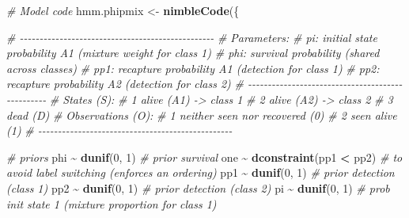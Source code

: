\documentclass[
  12pt,
]{krantz}
\newenvironment{Shaded}{\begin{snugshade}}{\end{snugshade}}
\newcommand{\CommentTok}[1]{\textcolor[rgb]{0.56,0.35,0.01}{\textit{#1}}}
\newcommand{\DecValTok}[1]{\textcolor[rgb]{0.00,0.00,0.81}{#1}}
\newcommand{\FunctionTok}[1]{\textcolor[rgb]{0.13,0.29,0.53}{\textbf{#1}}}
\newcommand{\NormalTok}[1]{#1}
\newcommand{\OtherTok}[1]{\textcolor[rgb]{0.56,0.35,0.01}{#1}}
\newcommand{\SpecialCharTok}[1]{\textcolor[rgb]{0.81,0.36,0.00}{\textbf{#1}}}
\begin{document}
\begin{Shaded}
\begin{Highlighting}[]
\CommentTok{\# Model code}
\NormalTok{hmm.phipmix }\OtherTok{\textless{}{-}} \FunctionTok{nimbleCode}\NormalTok{(\{}
  
  \CommentTok{\# {-}{-}{-}{-}{-}{-}{-}{-}{-}{-}{-}{-}{-}{-}{-}{-}{-}{-}{-}{-}{-}{-}{-}{-}{-}{-}{-}{-}{-}{-}{-}{-}{-}{-}{-}{-}{-}{-}{-}{-}{-}{-}{-}{-}{-}{-}{-}{-}{-}}
  \CommentTok{\# Parameters:}
  \CommentTok{\# pi: initial state probability A1   (mixture weight for class 1)}
  \CommentTok{\# phi: survival probability          (shared across classes)}
  \CommentTok{\# pp1: recapture probability A1      (detection for class 1)}
  \CommentTok{\# pp2: recapture probability A2      (detection for class 2)}
  \CommentTok{\# {-}{-}{-}{-}{-}{-}{-}{-}{-}{-}{-}{-}{-}{-}{-}{-}{-}{-}{-}{-}{-}{-}{-}{-}{-}{-}{-}{-}{-}{-}{-}{-}{-}{-}{-}{-}{-}{-}{-}{-}{-}{-}{-}{-}{-}{-}{-}{-}{-}}
  \CommentTok{\# States (S):}
  \CommentTok{\# 1 alive (A1)  {-}\textgreater{} class 1}
  \CommentTok{\# 2 alive (A2)  {-}\textgreater{} class 2}
  \CommentTok{\# 3 dead (D)}
  \CommentTok{\# Observations (O):}
  \CommentTok{\# 1 neither seen nor recovered (0)}
  \CommentTok{\# 2 seen alive (1)}
  \CommentTok{\# {-}{-}{-}{-}{-}{-}{-}{-}{-}{-}{-}{-}{-}{-}{-}{-}{-}{-}{-}{-}{-}{-}{-}{-}{-}{-}{-}{-}{-}{-}{-}{-}{-}{-}{-}{-}{-}{-}{-}{-}{-}{-}{-}{-}{-}{-}{-}{-}{-}}
  
  \CommentTok{\# priors}
\NormalTok{  phi }\SpecialCharTok{\textasciitilde{}} \FunctionTok{dunif}\NormalTok{(}\DecValTok{0}\NormalTok{, }\DecValTok{1}\NormalTok{) }\CommentTok{\# prior survival}
\NormalTok{  one }\SpecialCharTok{\textasciitilde{}} \FunctionTok{dconstraint}\NormalTok{(pp1 }\SpecialCharTok{\textless{}}\NormalTok{ pp2) }\CommentTok{\# to avoid label switching (enforces an ordering)}
\NormalTok{  pp1 }\SpecialCharTok{\textasciitilde{}} \FunctionTok{dunif}\NormalTok{(}\DecValTok{0}\NormalTok{, }\DecValTok{1}\NormalTok{) }\CommentTok{\# prior detection (class 1)}
\NormalTok{  pp2 }\SpecialCharTok{\textasciitilde{}} \FunctionTok{dunif}\NormalTok{(}\DecValTok{0}\NormalTok{, }\DecValTok{1}\NormalTok{) }\CommentTok{\# prior detection (class 2)}
\NormalTok{  pi }\SpecialCharTok{\textasciitilde{}} \FunctionTok{dunif}\NormalTok{(}\DecValTok{0}\NormalTok{, }\DecValTok{1}\NormalTok{)  }\CommentTok{\# prob init state 1 (mixture proportion for class 1)}
  

\end{Highlighting}
\end{Shaded}
\end{document}
